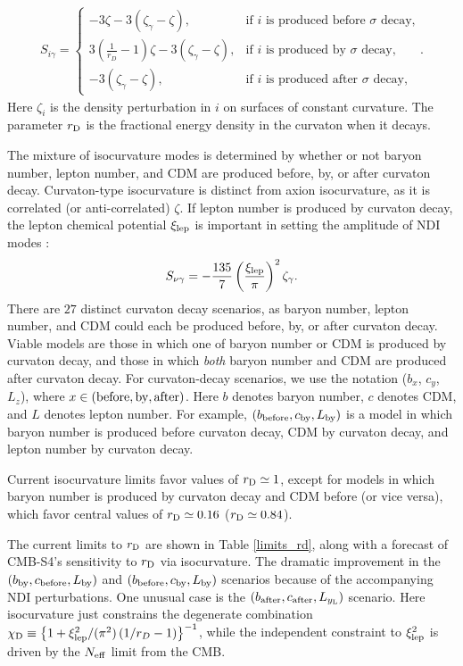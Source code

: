 \begin{eqnarray}
S_{i \gamma}=\left\{\begin{array}{ll}-3\zeta-3(\zeta_{\gamma}-\zeta),&\mbox{if $i$ is produced before $\sigma$ decay,}\\3\left(\frac{1}{r_{D}}-1\right)\zeta-3(\zeta_{\gamma}-\zeta),&\mbox{if $i$ is produced by $\sigma$ decay},\\ -3(\zeta_\gamma-\zeta),&\mbox{if $i$ is produced after $\sigma$ decay},\end{array}\right.\label{eq:strew}.
\end{eqnarray} Here $\zeta_{i}$ is the density perturbation in $i$ on surfaces of constant curvature. The parameter $r_{\rm D}$ is the fractional energy density in the curvaton when it decays. 

The mixture of isocurvature modes is determined by whether or not baryon number, lepton number, and CDM are produced before, by, or after curvaton decay. Curvaton-type isocurvature is distinct from axion isocurvature, as it is correlated (or anti-correlated) $\zeta$. If lepton number is produced by curvaton decay, the lepton chemical potential $\xi_{\rm lep}$ is important in setting the amplitude of NDI modes \cite{Lyth:2002my,Gordon:2003hw,DiValentino:2011sv}:
\begin{equation}
S_{\nu \gamma}=
-\frac{135}{7}\left(\frac{\xi_{\rm lep}}{\pi}\right)^2\zeta_{\gamma}.\end{equation}
There are $27$ distinct curvaton decay scenarios, as baryon number, lepton number, and CDM could each be produced before, by, or after curvaton decay. Viable models are those in which one of baryon number or CDM is produced by curvaton decay, and those in which \textit{both} baryon number and CDM are produced after curvaton decay. For curvaton-decay scenarios, we use the notation ($b_{x}$, $c_{y}$, $L_{z}$), where $x\in ({\rm before, by, after})$. Here $b$ denotes baryon number, $c$ denotes CDM, and $L$ denotes lepton number. For example, $(b_{\rm before}, c_{\rm by}, L_{\rm by})$ is a model in which baryon number is produced before curvaton decay, CDM by curvaton decay, and lepton number by curvaton decay.

Current isocurvature limits favor values of $r_{\rm D}\simeq 1$, except for models in which baryon number is produced by curvaton decay and CDM before (or vice versa), which favor central values of $r_{\rm D} \simeq 0.16$ ($r_{\rm D} \simeq 0.84$). 

The current limits \cite{Smith/Grin:2015} to $r_{\rm D}$ are shown in Table \ref{limits_rd}, along with a forecast of CMB-S4's sensitivity to $r_{\rm D}$ via isocurvature. The dramatic improvement in the $(b_{\rm by},c_{\rm before},L_{\rm by})$ and $(b_{\rm before},c_{\rm by},L_{\rm by})$ scenarios because of the accompanying NDI perturbations. One unusual case is the $(b_{\rm after},c_{\rm after}, L_{y_{\rm L}})$ scenario. Here isocurvature just constrains the degenerate combination \cite{Smith/Grin:2015} $\chi_{\rm D} \equiv \left\{1+\xi_{\rm lep}^2/(\pi^2) \left(1/r_D -1\right)\right\}^{-1}$, while the independent constraint to $\xi_{\rm lep}^{2}$ is driven by the $N_{\rm eff}$ limit from the CMB.

